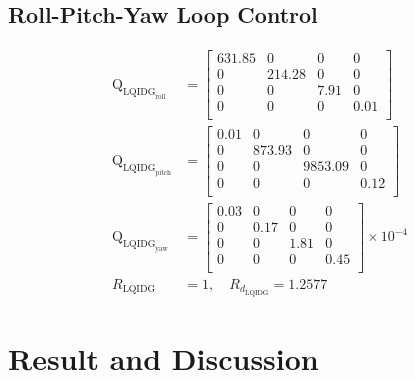 \documentclass[conference]{IEEEtran}
\begin{document}
\subsection{Roll-Pitch-Yaw Loop Control}
\begin{equation}
	\begin{split}
		\boldsymbol{\mathrm{Q}}_{{\text{LQIDG}_{\text{roll}}}} &= \begin{bmatrix}
			631.85 & 0 & 0 & 0  \\ 
			0 & 214.28 & 0 & 0  \\ 
			0 & 0 & 7.91 & 0  \\ 
			0 & 0 & 0 & 0.01  \\ 
		\end{bmatrix} \\[1em]
		\boldsymbol{\mathrm{Q}}_{{\text{LQIDG}_{\text{pitch}}}} &= \begin{bmatrix}
			0.01 & 0 & 0 & 0  \\
			0 & 873.93 & 0 & 0  \\ 
			0 & 0 & 9853.09 & 0 \\ 
			0 & 0 & 0 & 0.12  \\ 
		\end{bmatrix}\\[1em]
		\boldsymbol{\mathrm{Q}}_{{\text{LQIDG}_{\text{yaw}}}}  &= \begin{bmatrix}
			0.03 & 0 & 0 & 0 \\ 
			0 & 0.17 & 0 & 0 \\ 
			0 & 0 & 1.81 & 0 \\ 
			0 & 0 & 0 & 0.45 \\
		\end{bmatrix}\times 10^{-4}\\[1em]
          R_{{\text{LQIDG}}} &= 1, \quad  R_{d_{\text{LQIDG}}} = 1.2577
	\end{split}
\end{equation}

\section{Result and Discussion}
\end{document}
